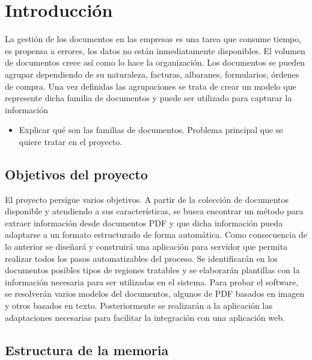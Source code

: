 
\chapter{Introducción}
\label{chap:introduccion}

La gestión de los documentos en las empresas es una tarea que consume tiempo, es propensa a errores, los datos no están inmediatamente disponibles. El volumen de documentos crece así como lo hace la organización. Los documentos se pueden agrupar dependiendo de su naturaleza, facturas, albaranes, formularios, órdenes de compra. Una vez definidas las agrupaciones se trata de crear un modelo que represente dicha familia de documentos y puede ser utilizado para capturar la información

\begin{itemize}
    \item Explicar qué son las familias de documentos. Problema principal que se quiere tratar en el proyecto.
\end{itemize}

\section{Objetivos del proyecto}

El proyecto persigue varios objetivos. A partir de la colección de documentos disponible y atendiendo a sus características, se busca encontrar un método para extraer información desde documentos PDF y que dicha información pueda adaptarse a un formato estructurado de forma automática. Como consecuencia de lo anterior se diseñará y construirá una aplicación para servidor que permita realizar todos los pasos automatizables del proceso. Se identificarán en los documentos posibles tipos de regiones tratables y se elaborarán plantillas con la información necesaria para ser utilizadas en el sistema. Para probar el software, se resolverán varios modelos del documentos, algunos de PDF basados en imagen y otros basados en texto. Posteriormente se realizarán a la aplicación las adaptaciones necesarias para facilitar la integración con una aplicación web.

\section{Estructura de la memoria}
